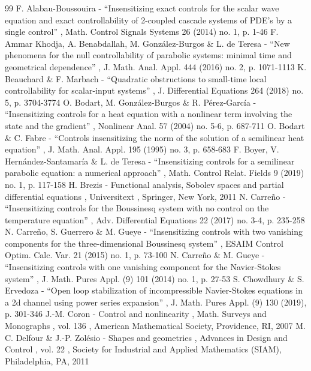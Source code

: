 \documentclass[10pt,a4paper]{amsart}
\theoremstyle{definition}
\begin{document}
\begin{thebibliography}{99}
 F. Alabau-Boussouira - “Insensitizing exact controls for the scalar wave equation and exact controllability of 2-coupled cascade systems of PDE’s by a single control” , Math. Control Signals Systems 26 (2014) no. 1, p. 1-46
 F. Ammar Khodja, A. Benabdallah, M. González-Burgos \& L. de Teresa - “New phenomena for the null controllability of parabolic systems: minimal time and geometrical dependence” , J. Math. Anal. Appl. 444 (2016) no. 2, p. 1071-1113
 K. Beauchard \& F. Marbach - “Quadratic obstructions to small-time local controllability for scalar-input systems” , J. Differential Equations 264 (2018) no. 5, p. 3704-3774
 O. Bodart, M. González-Burgos \& R. Pérez-García - “Insensitizing controls for a heat equation with a nonlinear term involving the state and the gradient” , Nonlinear Anal. 57 (2004) no. 5-6, p. 687-711
 O. Bodart \& C. Fabre - “Controls insensitizing the norm of the solution of a semilinear heat equation” , J. Math. Anal. Appl. 195 (1995) no. 3, p. 658-683
 F. Boyer, V. Hernández-Santamaría \& L. de Teresa - “Insensitizing controls for a semilinear parabolic equation: a numerical approach” , Math. Control Relat. Fields 9 (2019) no. 1, p. 117-158
 H. Brezis - Functional analysis, Sobolev spaces and partial differential equations , Universitext , Springer, New York, 2011
 N. Carreño - “Insensitizing controls for the Boussinesq system with no control on the temperature equation” , Adv. Differential Equations 22 (2017) no. 3-4, p. 235-258
 N. Carreño, S. Guerrero \& M. Gueye - “Insensitizing controls with two vanishing components for the three-dimensional Boussinesq system” , ESAIM Control Optim. Calc. Var. 21 (2015) no. 1, p. 73-100
 N. Carreño \& M. Gueye - “Insensitizing controls with one vanishing component for the Navier-Stokes system” , J. Math. Pures Appl. (9) 101 (2014) no. 1, p. 27-53
 S. Chowdhury \& S. Ervedoza - “Open loop stabilization of incompressible Navier-Stokes equations in a 2d channel using power series expansion” , J. Math. Pures Appl. (9) 130 (2019), p. 301-346
 J.-M. Coron - Control and nonlinearity , Math. Surveys and Monographs , vol. 136 , American Mathematical Society, Providence, RI, 2007
 M. C. Delfour \& J.-P. Zolésio - Shapes and geometries , Advances in Design and Control , vol. 22 , Society for Industrial and Applied Mathematics (SIAM), Philadelphia, PA, 2011

\end{thebibliography}
\end{document}
